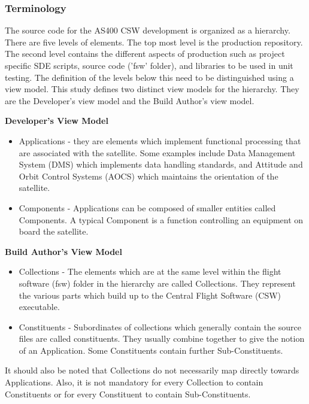 \documentclass[12pt, a4paper, titlepage]{scrartcl}
\begin{document}
\subsubsection{Terminology}
The source code for the AS400 CSW development is organized as a hierarchy. There are five levels of elements. The top most level is the production repository. The second level contains the different aspects of production such as project specific SDE scripts, source code ('fsw' folder), and libraries to be used in unit testing. The definition of the levels below this need to be distinguished using a view model. This study defines two distinct view models\cite{finkelstein1992viewpoints} for the hierarchy. They are the Developer's view model and the Build Author's view model. \\
\par \textbf{Developer's View Model}
\begin{itemize}
	\item Applications - they are elements which implement functional processing that are associated with the satellite. Some examples include Data Management System (DMS) which implements data handling standards, and Attitude and Orbit Control Systems (AOCS) which maintains the orientation of the satellite.
	\item Components - Applications can be composed of smaller entities called Components. A typical Component is a function controlling an equipment on board the satellite. 
\end{itemize}
\textbf{Build Author's View Model}
\begin{itemize}
	\item Collections - The elements which are at the same level within the flight software (fsw) folder in the hierarchy are called Collections. They represent the various parts which build up to the Central Flight Software (CSW) executable.
	\item Constituents - Subordinates of collections which generally contain the source files are called constituents. They usually combine together to give the notion of an Application. Some Constituents contain further Sub-Constituents.
\end{itemize}
It should also be noted that Collections do not necessarily map directly towards Applications. Also, it is not mandatory for every Collection to contain Constituents or for every Constituent to contain Sub-Constituents. 
\end{document}

